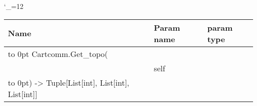 \begingroup \catcode`\_=12 \tt
\begin{tabular}{lll}
\toprule
\textrm{Name}&\textrm{Param name}&\textrm{param type}\\
\midrule
\hbox to 0pt {Cartcomm.Get_topo(\hss}\\
& self\\
\hbox to 0pt{) -> Tuple[List[int], List[int], List[int]]\hss}\\
\bottomrule
\end{tabular}
\endgroup
